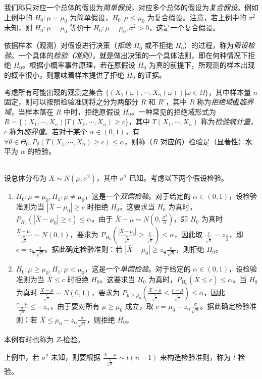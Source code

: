 \documentclass[../main.tex]{subfiles}
\begin{document}
我们称只对应一个总体的假设为\emph{简单假设}，对应多个总体的假设为\emph{复合假设}。例如上例中的 $H_0:\mu=\mu_0$ 为简单假设，$H_0:\mu\leq\mu_0$ 为复合假设。注意，若上例中的 $\sigma^2$ 未知，则 $H_0:\mu=\mu_0$ 等价于 $H_0:\mu=\mu_0,\sigma^2>0$，这是一个复合假设。

依据样本（观测）对假设进行决策（\emph{拒绝} $H_0$ 或不拒绝 $H_0$）的过程，称为\emph{假设检验}。一个具体的\emph{检验（准则）}，就是做出决策的一个具体法则，即在何种情况下拒绝 $H_0$。根据小概率事件原理，若在原假设 $H_0$ 为真的前提下，所观测的样本出现的概率很小，则意味着样本提供了拒绝 $H_0$ 的证据。

考虑所有可能出现的观测之集合 $\{(X_1(\omega),\cdots,X_n(\omega))|\omega\in\Omega\}$，其中样本量 $n$ 固定，则可以按照检验准则将之分为两部分 $R$ 和 $R^c$，其中 $R$ 称为\emph{拒绝域}或\emph{临界域}，当样本落在 $R$ 中时，拒绝原假设 $H_0$。一种常见的拒绝域形式为 $R=\{(X_1,\cdots,X_n)|T(X_1,\cdots,X_n)\geq c\}$，其中 $T(X_1,\cdots,X_n)$ 称为\emph{检验统计量}，$c$ 称为\emph{临界值}。若对于某个 $\alpha\in(0,1)$，有 $\forall\theta\in\Theta_0,P_\theta(T(X_1,\cdots,X_n)\geq c)\leq\alpha$，则称（$R$ 对应的）检验是（显著性）水平为 $\alpha$ 的检验。

\begin{example}
    \mbox{}\\
    设总体分布为 $X\sim N(\mu,\sigma^2)$，其中 $\sigma^2$ 已知。考虑以下两个假设检验。
    \begin{enumerate}
        \item $H_0:\mu=\mu_0,H_1:\mu\neq\mu_0$，这是一个\emph{双侧检验}。对于给定的 $\alpha\in(0,1)$，设检验准则为当 $|\bar X-\mu_0|\geq c$ 时拒绝 $H_0$。这要求当 $H_0$ 为真时，$P_{H_0}(|\bar X-\mu_0|\geq c)\leq\alpha$。由于 $\bar X-\mu\sim N(0,\frac{\sigma^2}n)$，即 $H_0$ 为真时 $\frac{\bar X-\mu_0}{\frac\sigma{\sqrt n}}\sim N(0,1)$，要求为 $P_{H_0}(\frac{|\bar X-\mu_0|}{\frac\sigma{\sqrt n}}\geq\frac c{\frac\sigma{\sqrt n}})\leq\alpha$，因此取 $\frac c{\frac{\sigma}{\sqrt n}}=z_{\frac\alpha 2}$，即 $c=z_{\frac\alpha 2}\frac\sigma{\sqrt n}$。据此确定检验准则：若 $|\bar X-\mu_0|\geq z_{\frac\alpha 2}\frac\sigma{\sqrt n}$，则拒绝 $H_0$。
        \item $H_0:\mu\geq\mu_0,H_1:\mu<\mu_0$，这是一个\emph{单侧检验}。对于给定的 $\alpha\in(0,1)$，设检验准则为当 $\bar X\leq c$ 时拒绝 $H_0$。这要求当 $H_0$ 为真时，$P_{H_0}(\bar X\leq c)\leq\alpha$。当 $H_0$ 为真时 $\frac{\bar X-\mu}{\frac\sigma{\sqrt n}}\sim N(0,1)$，要求为 $P_{\mu\geq\mu_0}(\frac{\bar X-\mu}{\frac\sigma{\sqrt n}}\leq\frac{c-\mu}{\frac\sigma{\sqrt n}})\leq\alpha$，因此 $\frac{c-\mu}{\frac{\sigma}{\sqrt n}}\leq-z_\alpha$，由于要对所有 $\mu\geq\mu_0$ 成立，取 $c=\mu_0-z_\alpha\frac\sigma{\sqrt n}$。据此确定检验准则：若 $\bar X\leq\mu_0-z_\alpha\frac\sigma{\sqrt n}$，则拒绝 $H_0$。
    \end{enumerate}
    本例有时也称为 $Z$-检验。
\end{example}

上例中，若 $\sigma^2$ 未知，则要根据 $\frac{\bar X-\mu}{\frac S{\sqrt n}}\sim t(n-1)$ 来构造检验准则，称为 $t$-检验。
\end{document}
